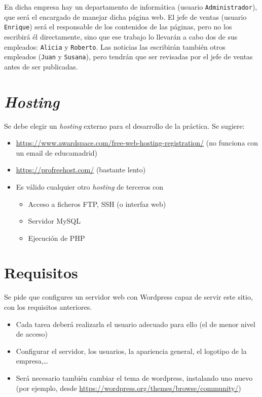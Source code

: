 \documentclass[a4paper]{article}
\begin{document}
En dicha empresa hay un departamento de informática (usuario \texttt{Administrador}), que será el encargado de manejar dicha página web. El jefe de ventas (usuario \texttt{Enrique}) será el responsable de los contenidos de las páginas, pero no los escribirá él directamente, sino que ese trabajo lo llevarán a cabo dos de sus empleados: \texttt{Alicia} y \texttt{Roberto}. Las noticias las escribirán también otros empleados (\texttt{Juan} y \texttt{Susana}), pero tendrán que ser revisadas por el jefe de ventas antes de ser publicadas.

\section{\emph{Hosting}}
\label{sec:org0000006}
Se debe elegir un \emph{hosting} externo para el desarrollo de la práctica. Se sugiere:
\begin{itemize}
\item \url{https://www.awardspace.com/free-web-hosting-registration/}   (no funciona con un email de educamadrid)
\item \url{https://profreehost.com/} (bastante lento)
\item Es válido cualquier otro \emph{hosting} de terceros con
\begin{itemize}
\item Acceso a ficheros FTP, SSH (o interfaz web)
\item Servidor MySQL
\item Ejecución de PHP
\end{itemize}
\end{itemize}

\section{Requisitos}
\label{sec:org0000009}
Se pide que configures un servidor web con Wordpress capaz de servir este sitio, con los requisitos anteriores.
\begin{itemize}
\item Cada tarea deberá realizarla el usuario adecuado para ello (el de menor nivel de acceso)
\item Configurar el servidor, los usuarios, la apariencia general, el logotipo de la empresa,\ldots{}
\item Será necesario también cambiar el tema de wordpress, instalando uno nuevo (por ejemplo, desde \url{https://wordpress.org/themes/browse/community/})
\end{itemize}
\end{document}
